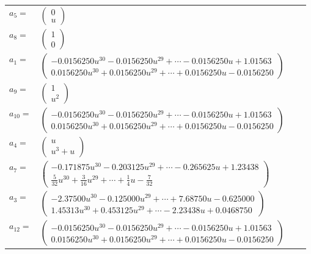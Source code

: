 \documentclass[1p]{elsarticle_modified}
\theoremstyle{definition}
\begin{document}
\begin{tabular}{m{7pt} m{180pt} m{7pt} m{180pt} }
\flushright $a_{5}=$&$\begin{pmatrix}0\\u\end{pmatrix}$ \\
\flushright $a_{8}=$&$\begin{pmatrix}1\\0\end{pmatrix}$ \\
\flushright $a_{1}=$&$\begin{pmatrix}-0.0156250 u^{30}-0.0156250 u^{29}+\cdots-0.0156250 u+1.01563\\0.0156250 u^{30}+0.0156250 u^{29}+\cdots+0.0156250 u-0.0156250\end{pmatrix}$ \\
\flushright $a_{9}=$&$\begin{pmatrix}1\\u^2\end{pmatrix}$ \\
\flushright $a_{10}=$&$\begin{pmatrix}-0.0156250 u^{30}-0.0156250 u^{29}+\cdots-0.0156250 u+1.01563\\0.0156250 u^{30}+0.0156250 u^{29}+\cdots+0.0156250 u-0.0156250\end{pmatrix}$ \\
\flushright $a_{4}=$&$\begin{pmatrix}u\\u^3+u\end{pmatrix}$ \\
\flushright $a_{7}=$&$\begin{pmatrix}-0.171875 u^{30}-0.203125 u^{29}+\cdots-0.265625 u+1.23438\\\frac{5}{32} u^{30}+\frac{3}{16} u^{29}+\cdots+\frac{1}{4} u-\frac{7}{32}\end{pmatrix}$ \\
\flushright $a_{3}=$&$\begin{pmatrix}-2.37500 u^{30}-0.125000 u^{29}+\cdots+7.68750 u-0.625000\\1.45313 u^{30}+0.453125 u^{29}+\cdots-2.23438 u+0.0468750\end{pmatrix}$ \\
\flushright $a_{12}=$&$\begin{pmatrix}-0.0156250 u^{30}-0.0156250 u^{29}+\cdots-0.0156250 u+1.01563\\0.0156250 u^{30}+0.0156250 u^{29}+\cdots+0.0156250 u-0.0156250\end{pmatrix}$ \\

\end{tabular}
\end{document}
